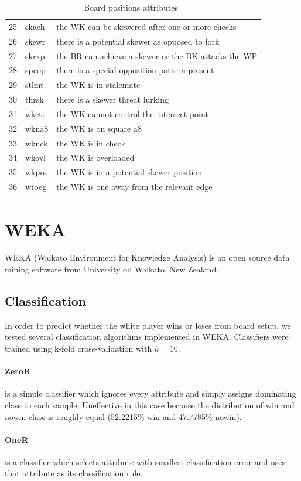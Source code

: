 \documentclass[11pt]{article}
\begin{document}
\begin{table}[h]
{\begin{tabular}{|l|l|l|}
25	&skach	&the WK can be skewered after one or more checks \\
26	&skewr	&there is a potential skewer as opposed to fork \\
27	&skrxp	&the BR can achieve a skewer or the BK attacks the WP \\
28	&spcop	&there is a special opposition pattern present \\
29	&stlmt	&the WK is in stalemate \\
30	&thrsk	&there is a skewer threat lurking \\
31	&wkcti	&the WK cannot control the intersect point \\
32	&wkna8	&the WK is on square a8 \\
33	&wknck	&the WK is in check \\
34	&wkovl	&the WK is overloaded \\
35	&wkpos	&the WK is in a potential skewer position \\
36	&wtoeg	&the WK is one away from the relevant edge \\
\hline
\end{tabular}
}
\caption{Board positions attributes~\citep{Michie1995-MICCAA-2}}
\label{tab:attributes}
\end{table}

\clearpage

\section{WEKA}
WEKA (Waikato Environment for Knowledge Analysis) is an open source data mining software from University od Waikato, New Zealand. 

\subsection{Classification}
In order to predict whether the white player wins or loses from board setup, we
tested several classification algorithms implemented in WEKA. Classifiers were trained using k-fold cross-validation with $k = 10$.

\paragraph{ZeroR} is a simple classifier which ignores every attribute and
simply assigns dominating class to each sample.  Uneffective in this case
because the distribution of win and nowin class is roughly equal (52.2215\% win
and 47.7785\% nowin).
\paragraph{OneR} is a classifier which selects attribute with smallest
classification error and uses that attribute as its classification rule.
\end{document}
